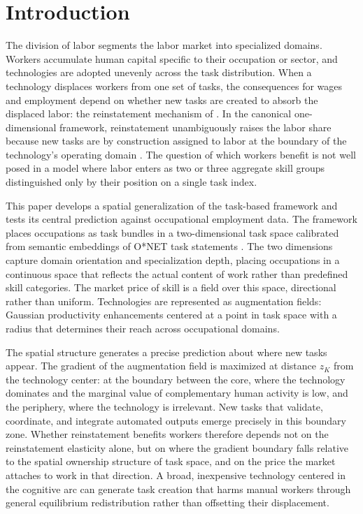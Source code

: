 \documentclass[12pt, a4paper]{article}
\begin{document}
\tableofcontents
\newpage

\section{Introduction}
\label{sec:intro}

The division of labor segments the labor market into specialized
domains. Workers accumulate human capital specific to their occupation
or sector, and technologies are adopted unevenly across the task
distribution. When a technology displaces workers from one set of
tasks, the consequences for wages and employment depend on whether
new tasks are created to absorb the displaced labor: the reinstatement
mechanism of \textcite{acemoglu2019automation}. In the canonical
one-dimensional framework, reinstatement unambiguously raises the
labor share because new tasks are by construction assigned to labor
at the boundary of the technology's operating domain
\parencite{acemoglu2018race}. The question
of which workers benefit is not well posed in a model where labor
enters as two or three aggregate skill groups distinguished only by
their position on a single task index.

This paper develops a spatial generalization of the task-based
framework and tests its central prediction against occupational
employment data. The framework places occupations as task bundles in
a two-dimensional task space calibrated from semantic embeddings of
O*NET task statements \parencite{storck2026geometry}. The two
dimensions capture domain orientation and specialization depth,
placing occupations in a continuous space that reflects the actual
content of work rather than predefined skill categories. The market
price of skill is a field over this space, directional rather than
uniform. Technologies are represented as augmentation fields: Gaussian
productivity enhancements centered at a point in task space with a
radius that determines their reach across occupational domains.

The spatial structure generates a precise prediction about where new
tasks appear. The gradient of the augmentation field is maximized at
distance $z_K$ from the technology center: at the boundary between
the core, where the technology dominates and the marginal value of
complementary human activity is low, and the periphery, where the
technology is irrelevant. New tasks that validate, coordinate, and
integrate automated outputs emerge precisely in this boundary zone.
Whether reinstatement benefits workers therefore depends not on the
reinstatement elasticity alone, but on where the gradient boundary
falls relative to the spatial ownership structure of task space, and
on the price the market attaches to work in that direction. A
broad, inexpensive technology centered in the cognitive arc can
generate task creation that harms manual workers through general
equilibrium redistribution rather than offsetting their displacement.
\end{document}
